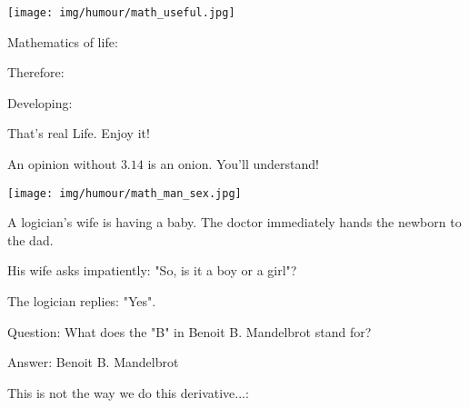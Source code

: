 	
	\begin{center}
		\texttt{[image: img/humour/math\_useful.jpg]}	
	\end{center}

	\begin{center}\underline{\hspace{5 cm}}\end{center}
	Mathematics of life:
	
	Therefore:
	
	Developing:
	
	That's real Life. Enjoy it!
	
	\begin{center}\underline{\hspace{5 cm}}\end{center}
	An opinion without $3.14$ is an onion. You'll understand!
	
	\begin{center}\underline{\hspace{5 cm}}\end{center}

	\begin{center}
		\texttt{[image: img/humour/math\_man\_sex.jpg]}	
	\end{center}
	
	\begin{center}\underline{\hspace{5 cm}}\end{center}
	
	A logician's wife is having a baby. The doctor immediately hands the newborn to the dad.
	
	His wife asks impatiently: "So, is it a boy or a girl"?
	
	The logician replies: "Yes".

	\begin{center}\underline{\hspace{5 cm}}\end{center}
	Question: What does the "B" in Benoit B. Mandelbrot stand for?	
	
	Answer: Benoit B. Mandelbrot
	
	\begin{center}\underline{\hspace{5 cm}}\end{center}
	
	This is not the way we do this derivative...:
	
	
	\begin{center}\underline{\hspace{5 cm}}\end{center}

